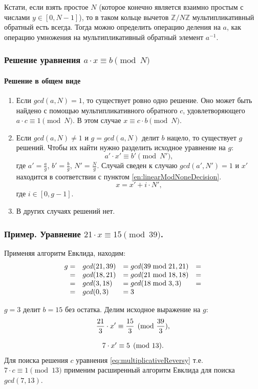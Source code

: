 Кстати, если взять простое $N$ (которое конечно является взаимно простым с числами $y\in[0,N-1]$), то в таком кольце вычетов $\mathbb{Z}/N\mathbb{Z}$ мультипликативный обратный есть всегда. Тогда можно определить операцию деления на $a$, как операцию умножения на мультипликативный обратный элемент $a^{-1}$.



\begin{frame}
    \frametitle{Решение уравнения $a\cdot x \equiv b\pmod{N}$}
    \framesubtitle{Решение в общем виде}
    
    \begin{enumerate}
    \item \label{en:linearModNoneDecision}
    Если $gcd(a,N)=1$, то существует ровно одно решение. Оно может быть найдено с помощью мультипликативного обратного $c$, удовлетворяющего $a\cdot c\equiv 1\pmod{N}$. В этом случае $x\equiv c\cdot b\pmod{N}$.

    \item Если $gcd(a,N)\neq 1$ и $g=gcd(a,N)$ делит $b$ нацело, то существует $g$ решений. Чтобы их найти нужно разделить исходное уравнение на $g$:
    \[a'\cdot x' \equiv b' \pmod{N'},\] где $a'=\frac{a}{g}$, $b'=\frac{b}{g}$, $N'=\frac{N}{g}$. Случай сведен к случаю $gcd(a',N')=1$ и $x'$ находится в соответствии с пунктом \ref{en:linearModNoneDecision}.
    \[x=x'+i\cdot N',\] где $i\in [0,g-1]$.
    
    \item В других случаях решений нет.
    \end{enumerate}
\end{frame}


\begin{frame}
    \frametitle{Пример. Уравнение $21\cdot x \equiv 15 \pmod{39}$.}

    Применяя алгоритм Евклида, находим:
    \[
        \begin{array}[c]{rlll}
        g=&gcd(21,39)&=gcd(39 \bmod 21, 21)&=\\
        =&gcd(18,21)&=gcd(21\bmod 18, 18)&=\\
        =&gcd(3,18)&=gcd(18 \bmod 3, 3)&=\\
        =&gcd(0,3)&=3
        \end{array}
    \]
    
    $g=3$ делит $b=15$ без остатка. Делим исходное выражение на $g$:
    \[
        \begin{array}[c]{c}
            \displaystyle
            \frac{21}{3}\cdot x' \equiv \frac{15}{3} \pmod{\frac{39}{3}},\\
            \\
            7\cdot x' \equiv 5 \pmod{13}.
        \end{array}
    \]    
    Для поиска решения $c$ уравнения \ref{eq:multiplicativeReversy} т.е. $7\cdot c\equiv 1 \pmod{13}$ применим расширенный алгоритм Евклида для поиска $gcd(7,13)$.
\end{frame}


